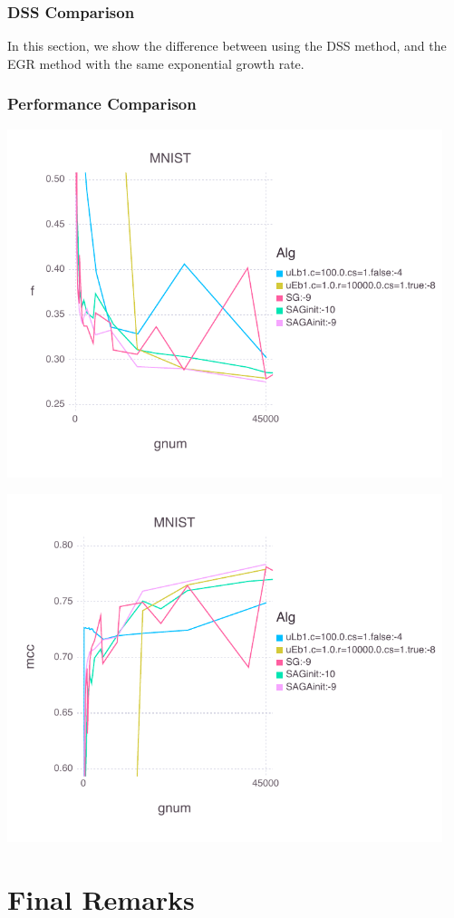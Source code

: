 \documentclass[11pt]{article}
\begin{document}
   
   \newpage
   
   \subsubsection{DSS Comparison}

   In this section, we show the difference between using the DSS method, and the EGR method with the same exponential growth rate.
   
   \newpage 
   
   \subsubsection{Performance Comparison}
   
   \includegraphics[width= 5in]{Figures/MNISTBLtruefOverall.pdf}
   
   \includegraphics[width= 5in]{Figures/MNISTBLtruemccOverall.pdf}
   
   
   
\section{Final Remarks} \label{finalr}

\newpage \small 



\end{document}
